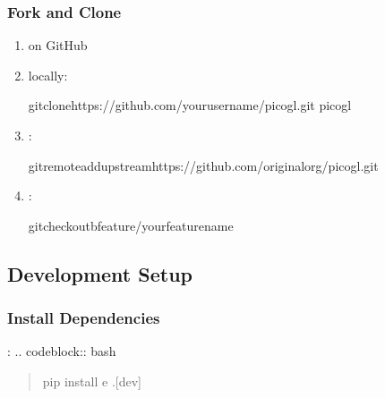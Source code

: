 \documentclass[a4paper,10pt,english,openany,oneside]{sphinxmanual}
\begin{document}
\subsubsection{Fork and Clone}
\label{\detokenize{contributing:fork-and-clone}}\begin{enumerate}
%
\item {} 
\sphinxAtStartPar
{} on GitHub

\item {} 
\sphinxAtStartPar
{} locally:

\begin{sphinxVerbatim}[commandchars=\\\{\}]
gitclonehttps://github.com/your\PYGZhy{}username/picogl.git
picogl
\end{sphinxVerbatim}

\item {} 
\sphinxAtStartPar
{}:

\begin{sphinxVerbatim}[commandchars=\\\{\}]
gitremoteaddupstreamhttps://github.com/original\PYGZhy{}org/picogl.git
\end{sphinxVerbatim}

\item {} 
\sphinxAtStartPar
{}:

\begin{sphinxVerbatim}[commandchars=\\\{\}]
gitcheckout\PYGZhy{}bfeature/your\PYGZhy{}feature\PYGZhy{}name
\end{sphinxVerbatim}

\end{enumerate}


\subsection{Development Setup}
\label{\detokenize{contributing:development-setup}}

\subsubsection{Install Dependencies}
\label{\detokenize{contributing:install-dependencies}}
\sphinxAtStartPar
{}:
.. code\sphinxhyphen{}block:: bash
\begin{quote}

\sphinxAtStartPar
pip install \sphinxhyphen{}e .{[}dev{]}
\end{quote}
\end{document}
